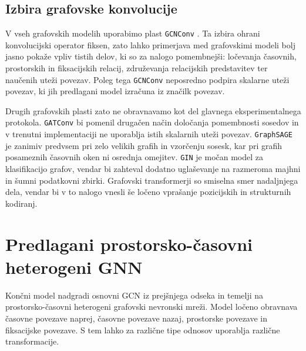 \subsection{Izbira grafovske konvolucije}
\label{subsec:izbira-grafovske-konvolucije}


V vseh grafovskih modelih uporabimo plast \texttt{GCNConv} \cite{kipf2017gcn}.
Ta izbira ohrani konvolucijski operator fiksen, zato lahko primerjava med grafovskimi modeli bolj jasno pokaže vpliv tistih delov, ki so za nalogo pomembnejši: ločevanja časovnih, prostorskih in fiksacijskih relacij, združevanja relacijskih predstavitev ter naučenih uteži povezav.
Poleg tega \texttt{GCNConv} neposredno podpira skalarne uteži povezav, ki jih predlagani model izračuna iz značilk povezav.

Drugih grafovskih plasti zato ne obravnavamo kot del glavnega eksperimentalnega protokola.
\texttt{GATConv} \cite{velickovic2018gat} bi pomenil drugačen način določanja pomembnosti sosedov in v trenutni implementaciji ne uporablja istih skalarnih uteži povezav.
\texttt{GraphSAGE} je zanimiv predvsem pri zelo velikih grafih in vzorčenju sosesk, kar pri grafih posameznih časovnih oken ni osrednja omejitev.
\texttt{GIN} je močan model za klasifikacijo grafov, vendar bi zahteval dodatno uglaševanje na razmeroma majhni in šumni podatkovni zbirki.
Grafovski transformerji so smiselna smer nadaljnjega dela, vendar bi v to nalogo vnesli še ločeno vprašanje pozicijskih in strukturnih kodiranj.

\section{Predlagani prostorsko-časovni heterogeni GNN}
\label{subsec:koncni-gnn}

Končni model nadgradi osnovni GCN iz prejšnjega odseka in temelji na prostorsko-časovni heterogeni grafovski nevronski mreži.
Model ločeno obravnava časovne povezave naprej, časovne povezave nazaj, prostorske povezave in fiksacijske povezave.
S tem lahko za različne tipe odnosov uporablja različne transformacije.


